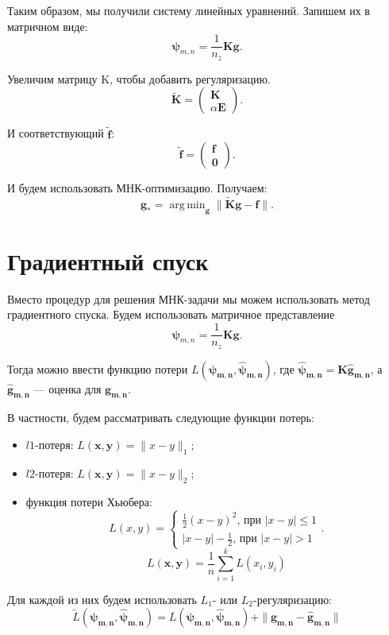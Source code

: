 \documentclass[12pt, a4paper]{report}
\DeclareMathOperator*{\argmin}{arg\,min}
\begin{document}
Таким образом, мы получили систему линейных уравнений. Запишем их в матричном виде:
\[
    \bm{\psi}_{m,n} = \frac{1}{n_z} \bm{K} \bm{g}
.\]

Увеличим матрицу K, чтобы добавить регуляризацию.
\[
    \bm{\tilde K} = 
    \begin{pmatrix}
        \bm{K} \\
        \alpha \bm{E}
    \end{pmatrix}
.\]

И соответствующий $\bm{\tilde f}$:
\[
    \bm{\tilde f} = 
    \begin{pmatrix}
        \bm{f} \\
        \bm{0}
    \end{pmatrix}
.\]

И будем использовать МНК-оптимизацию. Получаем:
\[
    \bm{g_*} = \argmin_{\bm{g}} \| \bm{\tilde K} \bm{g} - \bm{f} \|
.\]
%
\section{Градиентный спуск}
Вместо процедур для решения МНК-задачи мы можем использовать метод градиентного
спуска. Будем использовать матричное представление
\[
  \bm{\psi}_{m,n} = \frac{1}{n_z} \bm{K} \bm{g}
.\]

Тогда можно ввести функцию потери $L(\bm{\psi_{m,n}}, \bm{\hat{\psi}_{m,n}})$,
где $\bm{\hat{\psi}_{m,n}} = \bm{K} \bm{\hat{g}_{m,n}}$, а $\bm{\hat{g}_{m,n}}$ ---
оценка для $\bm{g_{m,n}}$.

В частности, будем рассматривать следующие функции потерь:
\begin{itemize}
\item $l1$-потеря: $L(\bm{x}, \bm{y}) = \| x - y \|_1$;
\item $l2$-потеря: $L(\bm{x}, \bm{y}) = \| x - y \|_2$;
\item функция потери Хьюбера:
  \[
    L(x, y) =
    \begin{cases}
      \frac{1}{2} (x-y)^2 \text{, при $|x-y| \leqslant 1$} \\
      |x-y| - \frac{1}{2} \text{, при $|x-y| > 1$}
    \end{cases}.
  \]
  \[
    L(\bm{x}, \bm{y}) = \frac{1}{n} \sum_{i=1}^k L(x_i, y_i)
  \]
\end{itemize}

Для каждой из них будем использовать $L_1$- или $L_2$-регуляризацию:
\[
  \tilde{L}(\bm{\psi_{m,n}}, \bm{\hat{\psi}_{m,n}}) = L(\bm{\psi_{m,n}}, \bm{\hat{\psi}_{m,n}}) + \| \bm{g_{m,n}} - \bm{\hat{g}_{m,n}} \|
\]
\end{document}

